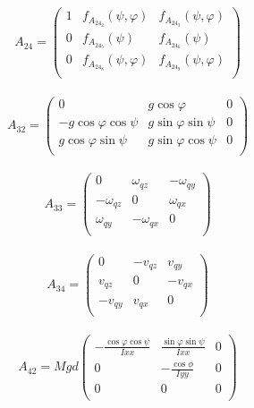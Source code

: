 \documentclass[main]{subfiles}
\begin{document}
\begin{equation}
A_{24}=\left(\begin{array}{ccc}
1 & f_{A_{24_2}}(\psi,\varphi) & f_{A_{24_3}}(\psi,\varphi) \\
0 & f_{A_{24_5}}(\psi) & f_{A_{24_6}}(\psi) \\
0&f_{A_{24_8}}(\psi,\varphi)&f_{A_{24_9}}(\psi,\varphi)\\
\end{array}\right)
\end{equation}\\

\begin{equation}
A_{32}=\left(\begin{array}{ccc}
0 & g\cos \varphi & 0 \\
-g\cos \varphi \cos \psi & g\sin\varphi\sin\psi & 0 \\
 g\cos \varphi \sin \psi & g\sin\varphi\cos\psi & 0 \\
\end{array}\right)
\end{equation}\\

\begin{equation}
A_{33}=\left(\begin{array}{ccc}
0 & \omega_{qz} & -\omega_{qy} \\
-\omega_{qz} & 0 &\omega_{qx} \\
\omega_{qy} & -\omega_{qx}& 0 \\
\end{array}\right)
\end{equation}\\

\begin{equation}
A_{34}=\left(\begin{array}{ccc}
0 & -v_{qz} & v_{qy} \\
v_{qz} & 0 &-v_{qx} \\
-v_{qy} & v_{qx}& 0 \\
\end{array}\right)
\end{equation}\\

\begin{equation}
A_{42}=Mgd\left(\begin{array}{ccc}
-\frac{\cos\varphi\cos\psi}{I{xx}} & \frac{\sin\varphi\sin\psi}{I{xx}} & 0 \\
0 & -\frac{\cos\phi}{I{yy}} &0 \\
0 & 0& 0 \\
\end{array}\right)
\end{equation}\\
\end{document}
